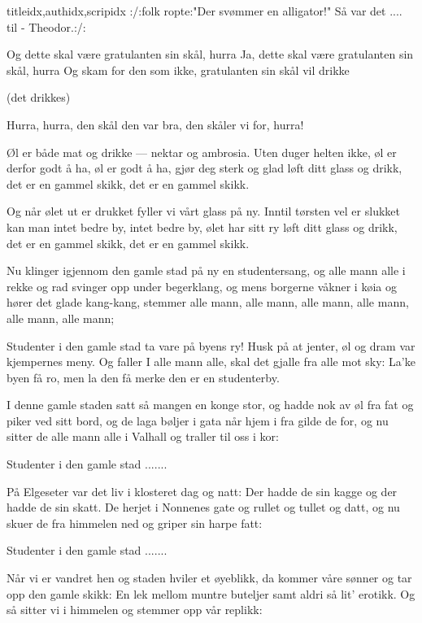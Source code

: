 \documentclass[14pt,letterpaper,norsk]{article}
\begin{document}
\begin{songs}{titleidx,authidx,scripidx}
\beginverse
:/:folk ropte:"Der svømmer en alligator!"
Så var det .... til - Theodor.:/:
\endverse
\endsong

\beginverse
Og dette skal være gratulanten sin skål, hurra
Ja, dette skal være gratulanten sin skål, hurra
Og skam for den som ikke, gratulanten sin skål vil drikke

(det drikkes)

Hurra, hurra, den skål den var bra, den skåler vi for, hurra!
\endverse
\endsong

\beginverse
Øl er både mat og drikke --- nektar og ambrosia.
Uten duger helten ikke, øl er derfor godt å ha,
øl er godt å ha, gjør deg sterk og glad
løft ditt glass og drikk, det er en gammel skikk,
det er en gammel skikk.
\endverse

\beginverse
Og når ølet ut er drukket fyller vi vårt glass på ny.
Inntil tørsten vel er slukket kan man intet bedre by,
intet bedre by, ølet har sitt ry
løft ditt glass og drikk, det er en gammel skikk,
det er en gammel skikk.
\endverse
\endsong

\beginverse
Nu klinger igjennom den gamle stad på ny en studentersang,
og alle mann alle i rekke og rad svinger opp under begerklang,
og mens borgerne våkner i køia og hører det glade kang-kang,
stemmer alle mann, alle mann, alle mann, alle mann, alle mann, alle mann;
\endverse

\beginchorus
Studenter i den gamle stad ta vare på byens ry!
Husk på at jenter, øl og dram var kjempernes meny.
Og faller I alle mann alle, skal det gjalle fra alle mot sky:
La'ke byen få ro, men la den få merke den er en studenterby.
\endchorus

\beginverse
I denne gamle staden satt så mangen en konge stor,
og hadde nok av øl fra fat og piker ved sitt bord,
og de laga bøljer i gata når hjem i fra gilde de for,
og nu sitter de alle mann alle i Valhall og traller til oss i kor:
\endverse

\beginchorus
Studenter i den gamle stad .......
\endchorus

\beginverse
På Elgeseter var det liv i klosteret dag og natt:
Der hadde de sin kagge og der hadde de sin skatt.
De herjet i Nonnenes gate og rullet og tullet og datt,
og nu skuer de fra himmelen ned og griper sin harpe fatt:
\endverse

\beginchorus
Studenter i den gamle stad .......
\endchorus

\beginverse
Når vi er vandret hen og staden hviler et øyeblikk,
da kommer våre sønner og tar opp den gamle skikk:
En lek mellom muntre buteljer samt aldri så lit' erotikk.
Og så sitter vi i himmelen og stemmer opp vår replikk:
\endverse


\end{songs}
\end{document}
